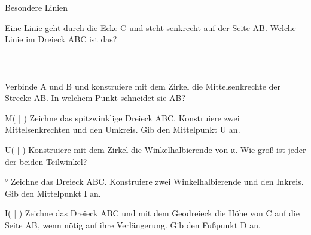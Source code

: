 \setcounter{aufgabe}{22}

\begin{aufgabe}{Besondere Linien}
\begin{teile}
\teil Eine Linie geht durch die Ecke C und steht senkrecht auf der Seite AB. Welche Linie im Dreieck ABC ist das? \\  \\  \\  \\ 
\teil Verbinde A und B und konstruiere mit dem Zirkel die Mittelsenkrechte der Strecke AB. In welchem Punkt schneidet sie AB?

\begin{ksys}[xmin=0,xmax=10,ymin=0,ymax=6]   \end{ksys}
M( \leerfeld | \leerfeld )
\teil Zeichne das spitzwinklige Dreieck ABC. Konstruiere zwei Mittelsenkrechten und den Umkreis. Gib den Mittelpunkt U an.

\begin{ksys}[xmin=0,xmax=10,ymin=0,ymax=8]    \end{ksys}
U( \leerfeld | \leerfeld )
\teil Konstruiere mit dem Zirkel die Winkelhalbierende von α. Wie groß ist jeder der beiden Teilwinkel?

\leerfeld °
\teil Zeichne das Dreieck ABC. Konstruiere zwei Winkelhalbierende und den Inkreis. Gib den Mittelpunkt I an.

\begin{ksys}[xmin=0,xmax=10,ymin=0,ymax=10]    \end{ksys}
I( \leerfeld | \leerfeld )
\teil Zeichne das Dreieck ABC und mit dem Geodreieck die Höhe von C auf die Seite AB, wenn nötig auf ihre Verlängerung. Gib den Fußpunkt D an.


\end{teile}
\end{aufgabe}
